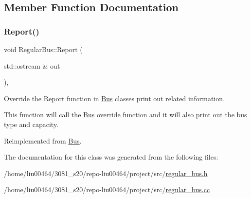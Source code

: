 \subsection{Member Function Documentation}
\mbox{\label{classRegularBus_a1c8e52afd8ba3cc1f6bf251e9cb10e5f}} 
\subsubsection{\texorpdfstring{Report()}{Report()}}
{\footnotesize\ttfamily void Regular\+Bus\+::\+Report (\begin{DoxyParamCaption}\item[{std\+::ostream \&}]{out }\end{DoxyParamCaption})\hspace{0.3cm}{\ttfamily [override]}, {\ttfamily [virtual]}}



Override the Report function in \hyperlink{classBus}{Bus} classes print out related information. 

This function will call the \hyperlink{classBus}{Bus} override function and it will also print out the bus type and capacity. 

Reimplemented from \hyperlink{classBus}{Bus}.



The documentation for this class was generated from the following files\+:\begin{DoxyCompactItemize}
\item 
/home/liu00464/3081\+\_\+s20/repo-\/liu00464/project/src/\hyperlink{regular__bus_8h}{regular\+\_\+bus.\+h}\item 
/home/liu00464/3081\+\_\+s20/repo-\/liu00464/project/src/\hyperlink{regular__bus_8cc}{regular\+\_\+bus.\+cc}\end{DoxyCompactItemize}
